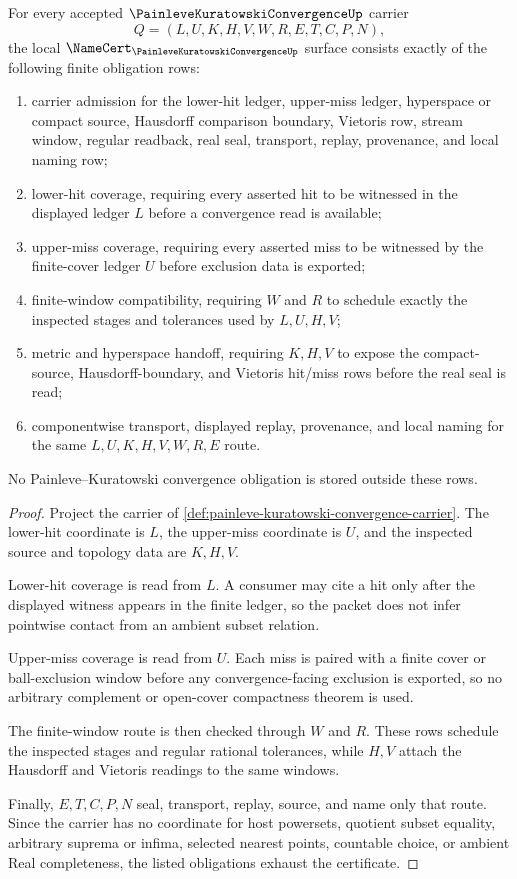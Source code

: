 \begin{theorem}
\label{thm:painleve-kuratowski-convergence-namecert-obligations}
For every accepted $\PainleveKuratowskiConvergenceUp$ carrier
$$
Q=(L,U,K,H,V,W,R,E,T,C,P,N),
$$
the local $\NameCert_{\PainleveKuratowskiConvergenceUp}$ surface consists exactly of the following finite obligation rows:
\begin{enumerate}
\item carrier admission for the lower-hit ledger, upper-miss ledger, hyperspace or compact source, Hausdorff comparison boundary, Vietoris row, stream window, regular readback, real seal, transport, replay, provenance, and local naming row;
\item lower-hit coverage, requiring every asserted hit to be witnessed in the displayed ledger $L$ before a convergence read is available;
\item upper-miss coverage, requiring every asserted miss to be witnessed by the finite-cover ledger $U$ before exclusion data is exported;
\item finite-window compatibility, requiring $W$ and $R$ to schedule exactly the inspected stages and tolerances used by $L,U,H,V$;
\item metric and hyperspace handoff, requiring $K,H,V$ to expose the compact-source, Hausdorff-boundary, and Vietoris hit/miss rows before the real seal is read;
\item componentwise transport, displayed replay, provenance, and local naming for the same $L,U,K,H,V,W,R,E$ route.
\end{enumerate}
No Painleve--Kuratowski convergence obligation is stored outside these rows.
\end{theorem}
\begin{proof}
Project the carrier of \autoref{def:painleve-kuratowski-convergence-carrier}. The lower-hit coordinate is $L$, the upper-miss coordinate is $U$, and the inspected source and topology data are $K,H,V$.

Lower-hit coverage is read from $L$. A consumer may cite a hit only after the displayed witness appears in the finite ledger, so the packet does not infer pointwise contact from an ambient subset relation.

Upper-miss coverage is read from $U$. Each miss is paired with a finite cover or ball-exclusion window before any convergence-facing exclusion is exported, so no arbitrary complement or open-cover compactness theorem is used.

The finite-window route is then checked through $W$ and $R$. These rows schedule the inspected stages and regular rational tolerances, while $H,V$ attach the Hausdorff and Vietoris readings to the same windows.

Finally, $E,T,C,P,N$ seal, transport, replay, source, and name only that route. Since the carrier has no coordinate for host powersets, quotient subset equality, arbitrary suprema or infima, selected nearest points, countable choice, or ambient Real completeness, the listed obligations exhaust the certificate.
\end{proof}


